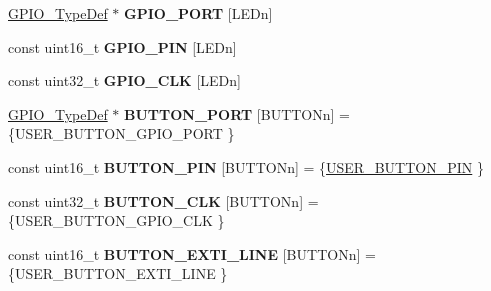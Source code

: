 \begin{DoxyCompactItemize}
\item 
\hyperlink{struct_g_p_i_o___type_def}{G\+P\+I\+O\+\_\+\+Type\+Def} $\ast$ {\bfseries G\+P\+I\+O\+\_\+\+P\+O\+R\+T} \mbox{[}L\+E\+Dn\mbox{]}
\item 
const uint16\+\_\+t {\bfseries G\+P\+I\+O\+\_\+\+P\+I\+N} \mbox{[}L\+E\+Dn\mbox{]}
\item 
const uint32\+\_\+t {\bfseries G\+P\+I\+O\+\_\+\+C\+L\+K} \mbox{[}L\+E\+Dn\mbox{]}
\item 
\hypertarget{group___s_t_m32_f4___d_i_s_c_o_v_e_r_y___l_o_w___l_e_v_e_l___private___variables_gad63ed42b4071e78f80f7462227da4f35}{}\hyperlink{struct_g_p_i_o___type_def}{G\+P\+I\+O\+\_\+\+Type\+Def} $\ast$ {\bfseries B\+U\+T\+T\+O\+N\+\_\+\+P\+O\+R\+T} \mbox{[}B\+U\+T\+T\+O\+Nn\mbox{]} = \{U\+S\+E\+R\+\_\+\+B\+U\+T\+T\+O\+N\+\_\+\+G\+P\+I\+O\+\_\+\+P\+O\+R\+T \}\label{group___s_t_m32_f4___d_i_s_c_o_v_e_r_y___l_o_w___l_e_v_e_l___private___variables_gad63ed42b4071e78f80f7462227da4f35}

\item 
\hypertarget{group___s_t_m32_f4___d_i_s_c_o_v_e_r_y___l_o_w___l_e_v_e_l___private___variables_gadf78f2d71408a01f8d30929c2d2da82b}{}const uint16\+\_\+t {\bfseries B\+U\+T\+T\+O\+N\+\_\+\+P\+I\+N} \mbox{[}B\+U\+T\+T\+O\+Nn\mbox{]} = \{\hyperlink{group___s_t_m32_f4___d_i_s_c_o_v_e_r_y___l_o_w___l_e_v_e_l___b_u_t_t_o_n_ga34df6915e3013d6a0c74131d3946b659}{U\+S\+E\+R\+\_\+\+B\+U\+T\+T\+O\+N\+\_\+\+P\+I\+N} \}\label{group___s_t_m32_f4___d_i_s_c_o_v_e_r_y___l_o_w___l_e_v_e_l___private___variables_gadf78f2d71408a01f8d30929c2d2da82b}

\item 
\hypertarget{group___s_t_m32_f4___d_i_s_c_o_v_e_r_y___l_o_w___l_e_v_e_l___private___variables_gaba532cec9f512c154ac07f1dfa7bfa2f}{}const uint32\+\_\+t {\bfseries B\+U\+T\+T\+O\+N\+\_\+\+C\+L\+K} \mbox{[}B\+U\+T\+T\+O\+Nn\mbox{]} = \{U\+S\+E\+R\+\_\+\+B\+U\+T\+T\+O\+N\+\_\+\+G\+P\+I\+O\+\_\+\+C\+L\+K \}\label{group___s_t_m32_f4___d_i_s_c_o_v_e_r_y___l_o_w___l_e_v_e_l___private___variables_gaba532cec9f512c154ac07f1dfa7bfa2f}

\item 
\hypertarget{group___s_t_m32_f4___d_i_s_c_o_v_e_r_y___l_o_w___l_e_v_e_l___private___variables_ga1760a56d44de70153c4c1a8c785d583b}{}const uint16\+\_\+t {\bfseries B\+U\+T\+T\+O\+N\+\_\+\+E\+X\+T\+I\+\_\+\+L\+I\+N\+E} \mbox{[}B\+U\+T\+T\+O\+Nn\mbox{]} = \{U\+S\+E\+R\+\_\+\+B\+U\+T\+T\+O\+N\+\_\+\+E\+X\+T\+I\+\_\+\+L\+I\+N\+E \}\label{group___s_t_m32_f4___d_i_s_c_o_v_e_r_y___l_o_w___l_e_v_e_l___private___variables_ga1760a56d44de70153c4c1a8c785d583b}


\end{DoxyCompactItemize}
